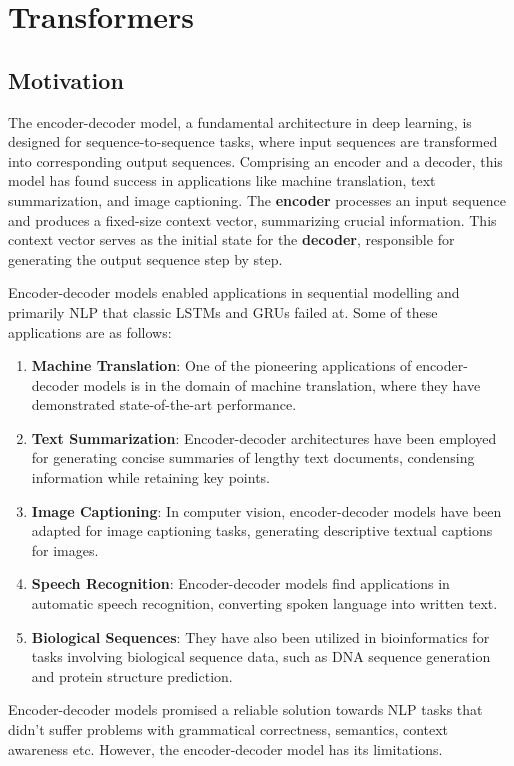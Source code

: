 \documentclass{report}
\begin{document}
\chapter{Transformers}
\section{Motivation} 
The encoder-decoder model, a fundamental architecture in deep learning, is designed for sequence-to-sequence tasks, where input sequences are transformed into corresponding output sequences. Comprising an encoder and a decoder, this model has found success in applications like machine translation, text summarization, and image captioning.
The \textbf{encoder} processes an input sequence and produces a fixed-size context vector, summarizing crucial information. This context vector serves as the initial state for the \textbf{decoder}, responsible for generating the output sequence step by step.

Encoder-decoder models enabled applications in sequential modelling and primarily NLP that classic LSTMs and GRUs failed at. Some of these applications are as follows:

\begin{enumerate}
    \item \textbf{Machine Translation}: One of the pioneering applications of encoder-decoder models is in the domain of machine translation, where they have demonstrated state-of-the-art performance.
     \item \textbf{Text Summarization}: Encoder-decoder architectures have been employed for generating concise summaries of lengthy text documents, condensing information while retaining key points.
     \item \textbf{Image Captioning}: In computer vision, encoder-decoder models have been adapted for image captioning tasks, generating descriptive textual captions for images.
      \item \textbf{Speech Recognition}: Encoder-decoder models find applications in automatic speech recognition, converting spoken language into written text.
      \item \textbf{Biological Sequences}: They have also been utilized in bioinformatics for tasks involving biological sequence data, such as DNA sequence generation and protein structure prediction.
\end{enumerate}

Encoder-decoder models promised a reliable solution towards NLP tasks that didn't suffer problems with grammatical correctness, semantics, context awareness etc. However, the encoder-decoder model has its limitations.
\end{document}
